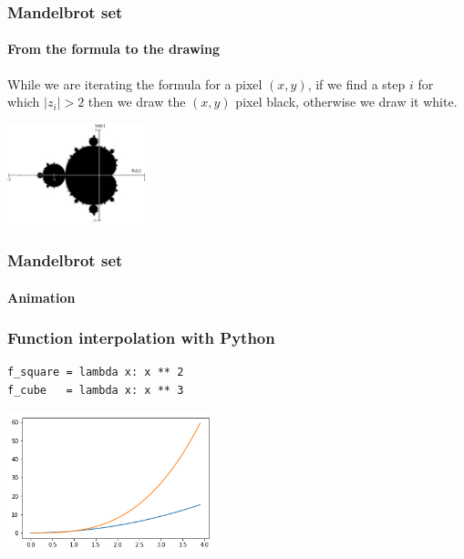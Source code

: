 \documentclass[9pt]{beamer}
\begin{document}
\begin{frame}
  \frametitle{Mandelbrot set}

  \framesubtitle{From the formula to the drawing}

  While we are iterating the formula for a pixel $(x, y)$, if we find
  a step $i$ for which $|z_{i}| > 2$ then we draw the $(x, y)$ pixel
  black, otherwise we draw it white.

  \bigskip

  \begin{center}
    \includegraphics[width = 4cm]{images/mandelbrot_simple.png}
  \end{center}

\end{frame}

\begin{frame}
  \frametitle{Mandelbrot set}

  \framesubtitle{Animation}

\end{frame}

\begin{frame}[fragile]
  \frametitle{Function interpolation with Python}

  \begin{lstlisting}
f_square = lambda x: x ** 2
f_cube   = lambda x: x ** 3
  \end{lstlisting}

  \begin{center}
    \includegraphics[width = 6cm]{images/two_functions.png}
  \end{center}

\end{frame}
\end{document}
